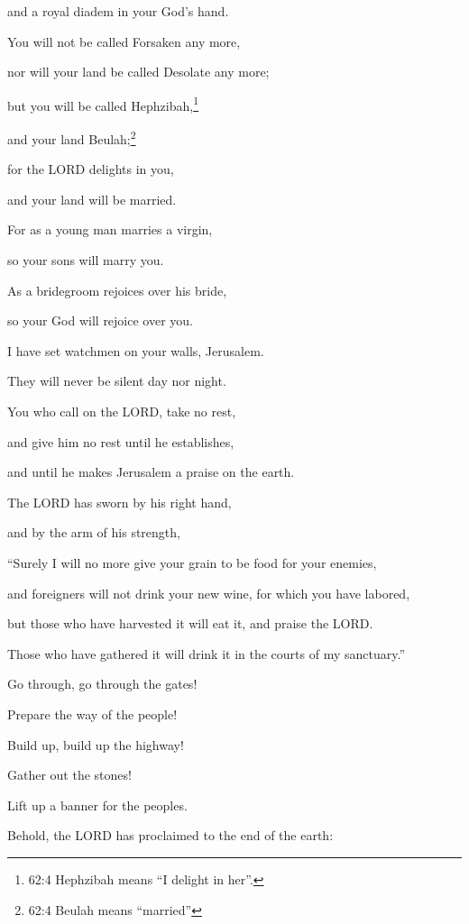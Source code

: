 and a royal diadem in your God’s hand.

\myverse{}You will not be called Forsaken any more,

nor will your land be called Desolate any more;

but you will be called Hephzibah,\footnote{62:4 Hephzibah means “I delight in her”.}

and your land Beulah;\footnote{62:4 Beulah means “married”}

for the LORD delights in you,

and your land will be married.

\myverse{}For as a young man marries a virgin,

so your sons will marry you.

As a bridegroom rejoices over his bride,

so your God will rejoice over you.


\vspace{\baselineskip} \myverse{}I have set watchmen on your walls, Jerusalem.

They will never be silent day nor night.

You who call on the LORD, take no rest,

\myverse{}and give him no rest until he establishes,

and until he makes Jerusalem a praise on the earth.


\vspace{\baselineskip} \myverse{}The LORD has sworn by his right hand,

and by the arm of his strength,

“Surely I will no more give your grain to be food for your enemies,

and foreigners will not drink your new wine, for which you have labored,

\myverse{}but those who have harvested it will eat it, and praise the LORD.

Those who have gathered it will drink it in the courts of my sanctuary.”


\vspace{\baselineskip} \myverse{}Go through, go through the gates!

Prepare the way of the people!

Build up, build up the highway!

Gather out the stones!

Lift up a banner for the peoples.

\myverse{}Behold, the LORD has proclaimed to the end of the earth:

